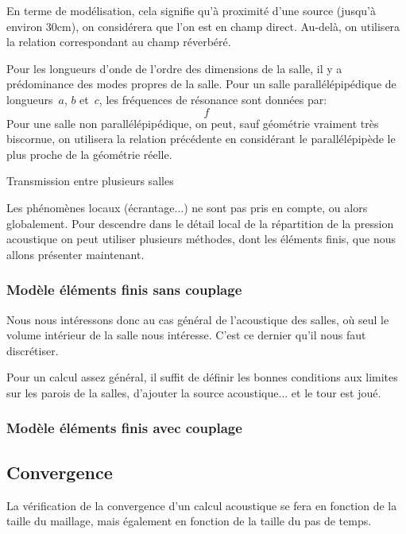 \medskip
En terme de modélisation, cela signifie qu'à proximité d'une source (jusqu'à environ 30cm), on considérera que l'on est en champ direct. Au-delà, on utilisera la relation correspondant au champ réverbéré.



\medskip
Pour les longueurs d'onde de l'ordre des dimensions de la salle, il y a prédominance des modes propres de la salle.
Pour un salle parallélépipédique de longueurs~$a$, $b$ et~$c$, les fréquences de résonance sont données par:
\begin{equation}
f
\end{equation}
Pour une salle non parallélépipédique, on peut, sauf géométrie vraiment très biscornue, on utilisera la relation précédente en considérant le parallélépipède le plus proche de la géométrie réelle.



\medskip
Transmission entre plusieurs salles

\medskip
Les phénomènes locaux (écrantage...) ne sont pas pris en compte, ou alors globalement.
Pour descendre dans le détail local de la répartition de la pression acoustique on peut utiliser plusieurs méthodes, dont les éléments finis, que nous allons présenter maintenant.

\medskip
\subsubsection{Modèle éléments finis sans couplage}

Nous nous intéressons donc au cas général de l'acoustique des salles, où seul le volume intérieur de la salle nous intéresse. C'est ce dernier qu'il nous faut discrétiser.

Pour un calcul assez général, il suffit de définir les bonnes conditions aux limites sur les parois de la salles, d'ajouter la source acoustique... et le tour est joué.

\medskip
\subsubsection{Modèle éléments finis avec couplage}



\medskip
\subsection{Convergence}

La vérification de la convergence d'un calcul acoustique se fera en fonction de la taille du maillage, mais également en fonction de la taille du pas de temps.


